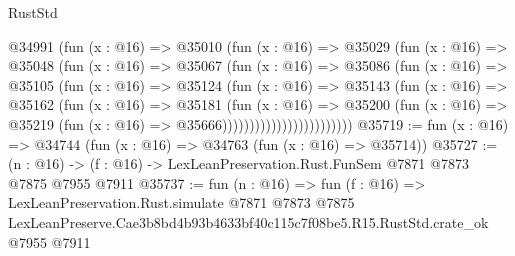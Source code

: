 \begin{lexlean}{RustStd}
\begin{coremodule}
                        @34991
                          (fun (x : @16) =>
                          @35010
                            (fun (x : @16) =>
                            @35029
                              (fun (x : @16) =>
                              @35048
                                (fun (x : @16) =>
                                @35067
                                  (fun (x : @16) =>
                                  @35086
                                    (fun (x : @16) =>
                                    @35105
                                      (fun (x : @16) =>
                                      @35124
                                        (fun (x : @16) =>
                                        @35143
                                          (fun (x : @16) =>
                                          @35162
                                            (fun (x : @16) =>
                                            @35181
                                              (fun (x : @16) =>
                                              @35200
                                                (fun (x : @16) =>
                                                @35219
                                                  (fun (x : @16) => @35666))))))))))))))))))))))))
@35719 := fun (x : @16) => @34744 (fun (x : @16) => @34763 (fun (x : @16) => @35714))
@35727 := (n : @16) -> (f : @16) -> LexLeanPreservation.Rust.FunSem @7871 @7873 @7875 @7955 @7911
@35737 := fun (n : @16) =>
  fun (f : @16) =>
  LexLeanPreservation.Rust.simulate
    @7871
    @7873
    @7875
    LexLeanPreserve.Cae3b8bd4b93b4633bf40c115c7f08be5.R15.RustStd.crate_ok
    @7955
    @7911
\end{coremodule}
\end{lexlean}
